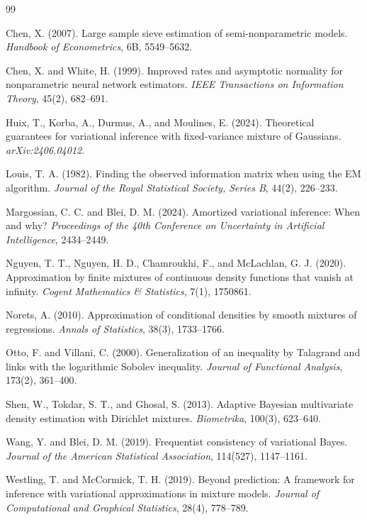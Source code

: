 \documentclass[11pt]{article}
\theoremstyle{definition}
\begin{document}
\begin{thebibliography}{99}

Chen, X. (2007).
Large sample sieve estimation of semi-nonparametric models.
\emph{Handbook of Econometrics}, 6B, 5549--5632.

Chen, X. and White, H. (1999).
Improved rates and asymptotic normality for nonparametric neural network estimators.
\emph{IEEE Transactions on Information Theory}, 45(2), 682--691.

Huix, T., Korba, A., Durmus, A., and Moulines, E. (2024).
Theoretical guarantees for variational inference with fixed-variance mixture of Gaussians.
\emph{arXiv:2406.04012}.

Louis, T. A. (1982).
Finding the observed information matrix when using the EM algorithm.
\emph{Journal of the Royal Statistical Society, Series B}, 44(2), 226--233.

Margossian, C. C. and Blei, D. M. (2024).
Amortized variational inference: When and why?
\emph{Proceedings of the 40th Conference on Uncertainty in Artificial Intelligence}, 2434--2449.

Nguyen, T. T., Nguyen, H. D., Chamroukhi, F., and McLachlan, G. J. (2020).
Approximation by finite mixtures of continuous density functions that vanish at infinity.
\emph{Cogent Mathematics \& Statistics}, 7(1), 1750861.

Norets, A. (2010).
Approximation of conditional densities by smooth mixtures of regressions.
\emph{Annals of Statistics}, 38(3), 1733--1766.

Otto, F. and Villani, C. (2000).
Generalization of an inequality by Talagrand and links with the logarithmic Sobolev inequality.
\emph{Journal of Functional Analysis}, 173(2), 361--400.

Shen, W., Tokdar, S. T., and Ghosal, S. (2013).
Adaptive Bayesian multivariate density estimation with Dirichlet mixtures.
\emph{Biometrika}, 100(3), 623--640.

Wang, Y. and Blei, D. M. (2019).
Frequentist consistency of variational Bayes.
\emph{Journal of the American Statistical Association}, 114(527), 1147--1161.

Westling, T. and McCormick, T. H. (2019).
Beyond prediction: A framework for inference with variational approximations in mixture models.
\emph{Journal of Computational and Graphical Statistics}, 28(4), 778--789.

\end{thebibliography}
\end{document}
